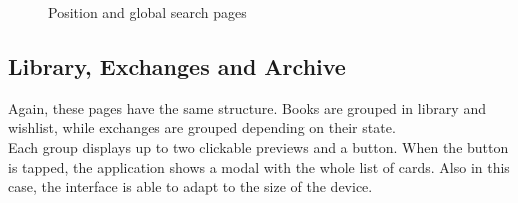 \begin{figure}[H]
{      }
      \caption{Position and global search pages}
\end{figure}

\clearpage
\subsection{Library, Exchanges and Archive}
Again, these pages have the same structure. Books are grouped in library and wishlist, while exchanges are grouped depending on their state.\\
Each group displays up to two clickable previews and a button.
When the button is tapped, the application shows a modal with the whole list of cards.
Also in this case, the interface is able to adapt to the size of the device.

